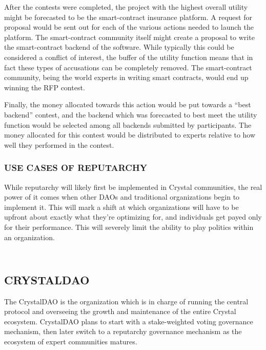 After the contests were completed, the project with the highest overall
utility might be forecasted to be the smart-contract insurance platform.
A request for proposal would be sent out for each of the various actions
needed to launch the platform. The smart-contract community itself might
create a proposal to write the smart-contract backend of the software.
While typically this could be considered a conflict of interest, the
buffer of the utility function means that in fact these types of
accusations can be completely removed. The smart-contract community,
being the world experts in writing smart contracts, would end up winning
the RFP contest.

Finally, the money allocated towards this action would be put towards a
``best backend'' contest, and the backend which was forecasted to best
meet the utility function would be selected among all backends submitted
by participants. The money allocated for this contest would be
distributed to experts relative to how well they performed in the
contest.

\subsubsection{\texorpdfstring{\protect\hypertarget{_l81u909gwhhz}{}{\protect\hypertarget{_Toc462050423}{}{}}USE
CASES OF
REPUTARCHY}{USE CASES OF REPUTARCHY}}\label{use-cases-of-reputarchy}

While reputarchy will likely first be implemented in Crystal
communities, the real power of it comes when other DAOs and traditional
organizations begin to implement it. This will mark a shift at which
organizations will have to be upfront about exactly what they're
optimizing for, and individuals get payed only for their performance.
This will severely limit the ability to play politics within an
organization.

\subsection{\texorpdfstring{\\
CRYSTALDAO}{ CRYSTALDAO}}\label{crystaldao}

The CrystalDAO is the organization which is in charge of running the
central protocol and overseeing the growth and maintenance of the entire
Crystal ecosystem. CrystalDAO plans to start with a stake-weighted
voting governance mechanism, then later switch to a reputarchy
governance mechanism as the ecosystem of expert communities matures.

